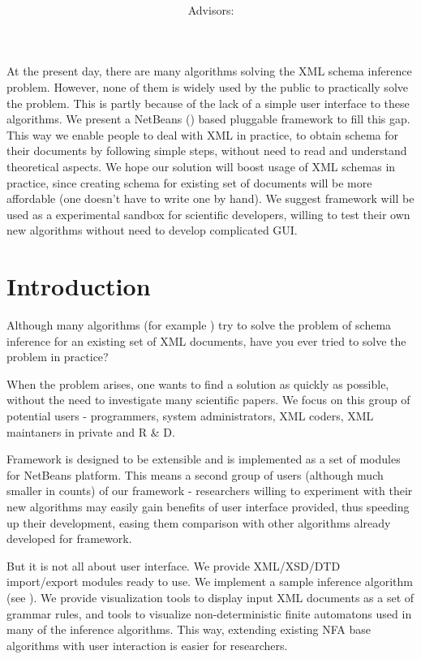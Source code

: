 \documentclass[a4paper,8pt,oneside,twocolumn]{article}
\title{\bf\mftitle}
\author{\mfauthor \\ Advisors: \mfadvisor}
\date{\mfplacedate}
\begin{document}
\maketitle

\abstract
At the present day, there are many algorithms solving the XML schema inference problem.
However, none of them is widely used by the public to practically solve the problem.
This is partly because of the lack of a simple user interface to these algorithms.
We present a NetBeans (\cite{netbeans}) based pluggable framework to fill this gap.
This way we enable people to deal with XML in practice, to obtain schema for their documents by following simple steps, without need to read and understand theoretical aspects.
We hope our solution will boost usage of XML schemas in practice, since creating schema for existing set of documents will be more affordable (one doesn't have to write one by hand).
We suggest framework will be used as a experimental sandbox for scientific developers, willing to test their own new algorithms without need to develop complicated GUI.

\section*{Introduction}
Although many algorithms (for example \cite{ahonen, Bex:2006:ICD:1182635.1164139, Bex:2007:IXS:1325851.1325964, 1802522, vyhnanovska}) try to solve the problem of schema inference for an existing set of XML documents, have you ever tried to solve the problem in practice?

When the problem arises, one wants to find a solution as quickly as possible, without the need to investigate many scientific papers.
We focus on this group of potential users - programmers, system administrators, XML coders, XML maintaners in private and R \& D.

Framework is designed to be extensible and is implemented as a set of modules for NetBeans platform.
This means a second group of users (although much smaller in counts) of our framework - researchers willing to experiment with their new algorithms may easily gain benefits of user interface provided, thus speeding up their development, easing them comparison with other algorithms already developed for framework.

But it is not all about user interface.
We provide XML/XSD/DTD import/export modules ready to use.
We implement a sample inference algorithm (see \cite{ahonen}).
We provide visualization tools to display input XML documents as a set of grammar rules, and tools to visualize non-deterministic finite automatons used in many of the inference algorithms.
This way, extending existing NFA base algorithms with user interaction is easier for researchers.
\end{document}
